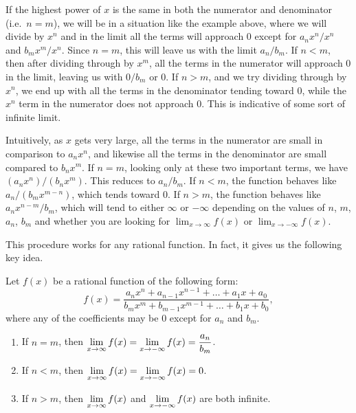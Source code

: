 If the highest power of $x$ is the same in both the numerator and denominator (i.e.\ $n=m$), we will be in a situation like the example above, where we will divide by $x^n$ and in the limit all the terms will approach 0 except for $a_nx^n/x^n$ and $b_mx^m/x^n$. Since $n=m$, this will leave us with the limit $a_n/b_m$.  If $n<m$, then after dividing through by $x^m$, all the terms in the numerator will approach 0 in the limit, leaving us with $0/b_m$ or 0.  If $n>m$, and we try dividing through by $x^n$, we end up with all the terms in the denominator tending toward 0, while the $x^n$ term in the numerator does not approach 0.  This is indicative of some sort of infinite limit.

Intuitively, as $x$ gets very large, all the terms in the numerator are small in comparison to $a_nx^n$, and likewise all the terms in the denominator are small compared to $b_nx^m$.  If $n=m$, looking only at these two important terms, we have $(a_nx^n)/(b_nx^m)$.  This reduces to $a_n/b_m$.  If $n<m$, the function behaves like $a_n/(b_mx^{m-n})$, which tends toward 0.  If $n>m$, the function behaves like $a_nx^{n-m}/b_m$, which will tend to either $\infty$ or $-\infty$ depending on the values of $n$, $m$, $a_n$, $b_m$ and whether you are looking for $\lim_{x\rightarrow\infty} f(x)$ or $\lim_{x\rightarrow-\infty} f(x)$.

This procedure works for any rational function.  In fact, it gives us the following key idea.

\begin{keyidea}\label{thm:lim_rational_fn_at_infty}%
Let $f(x)$ be a rational function of the following form:
\[f(x)=\frac{a_nx^n + a_{n-1}x^{n-1}+\dots + a_1x + a_0}{b_mx^m + b_{m-1}x^{m-1} + \dots + b_1x + b_0},\]
where any of the coefficients may be 0 except for $a_n$ and $b_m$.
\begin{enumerate}
\item If $n=m$, then $\displaystyle\lim_{x\rightarrow\infty} f(x) = \lim_{x\rightarrow-\infty} f(x) = \frac{a_n}{b_m}$.
\item If $n<m$, then $\displaystyle\lim_{x\rightarrow\infty} f(x) = \lim_{x\rightarrow-\infty} f(x) = 0$.
\item If $n>m$, then $\displaystyle\lim_{x\rightarrow\infty} f(x)$ and $\displaystyle\lim_{x\to-\infty} f(x)$ are both infinite.
\end{enumerate}
\end{keyidea}


